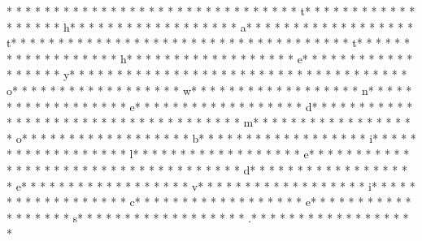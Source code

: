 *  * * *  *  * * *  *  * * *  *  * * *  * * *  * * *  *  * * *  *  * * *  * t* * *  * * *  * * *  *  * * *  *  * * *  * h* * *  * * *  * * *  *  * * *  *  * * *  * a* * *  * * *  * * *  *  * * *  *  * * *  * t* * *  * * *  * * *  *  * * *  *  * * *  *  * * *  * * *  * * *  *  * * *  *  * * *  * t* * *  * * *  * * *  *  * * *  *  * * *  * h* * *  * * *  * * *  *  * * *  *  * * *  * e* * *  * * *  * * *  *  * * *  *  * * *  * y* * *  * * *  * * *  *  * * *  *  * * *  *  * * *  * * *  * * *  *  * * *  *  * * *  * o* * *  * * *  * * *  *  * * *  *  * * *  * w* * *  * * *  * * *  *  * * *  *  * * *  * n* * *  * * *  * * *  *  * * *  *  * * *  * e* * *  * * *  * * *  *  * * *  *  * * *  * d* * *  * * *  * * *  *  * * *  *  * * *  *  * * *  * * *  * * *  *  * * *  *  * * *  * m* * *  * * *  * * *  *  * * *  *  * * *  * o* * *  * * *  * * *  *  * * *  *  * * *  * b* * *  * * *  * * *  *  * * *  *  * * *  * i* * *  * * *  * * *  *  * * *  *  * * *  * l* * *  * * *  * * *  *  * * *  *  * * *  * e* * *  * * *  * * *  *  * * *  *  * * *  *  * * *  * * *  * * *  *  * * *  *  * * *  * d* * *  * * *  * * *  *  * * *  *  * * *  * e* * *  * * *  * * *  *  * * *  *  * * *  * v* * *  * * *  * * *  *  * * *  *  * * *  * i* * *  * * *  * * *  *  * * *  *  * * *  * c* * *  * * *  * * *  *  * * *  *  * * *  * e* * *  * * *  * * *  *  * * *  *  * * *  * s* * *  * * *  * * *  *  * * *  *  * * *  * .* * *  * * *  * * *  *  * * *  *  * * *  * 
